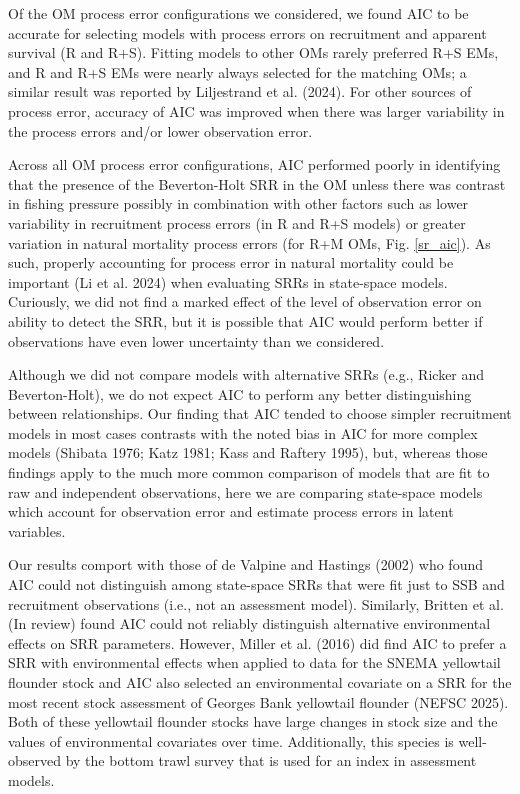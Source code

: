 \documentclass[
  12pt,
]{article}
\providecommand{\DIFaddbegin}{} %
\providecommand{\DIFaddend}{} %
\newcommand{\DIFaddincludegraphics}[2][]{{\color{blue}\fbox{\DIFOincludegraphics[#1]{#2}}}} %
\DeclareRobustCommand{\DIFaddbegin}{\DIFOaddbegin \let\includegraphics\DIFaddincludegraphics} %
\DeclareRobustCommand{\DIFaddend}{\DIFOaddend \let\includegraphics\DIFOincludegraphics} %
\begin{document}
Of the OM process error configurations we considered, we found AIC to be
accurate for selecting models with process errors on recruitment and
apparent survival (R and R+S). Fitting models to other OMs rarely
preferred R+S EMs, and R and R+S EMs were nearly always selected for the
matching OMs; a similar result was reported by Liljestrand et al.
(2024). For other sources of process error, accuracy of AIC was improved
when there was larger variability in the process errors and/or lower
observation error.

Across all OM process error configurations, AIC performed poorly in
identifying that the presence of the Beverton-Holt SRR in the OM unless
there was contrast in fishing pressure possibly in combination with
other factors such as lower variability in recruitment process errors
(in R and R+S models) or greater variation in natural mortality process
errors (for R+M OMs, Fig. \ref{sr_aic}). As such, properly accounting
for process error in natural mortality could be important (Li et al.
2024) when evaluating SRRs in state-space models. Curiously, we did not
find a marked effect of the level of observation error on ability to
detect the SRR, but it is possible that AIC would perform better if
observations have even lower uncertainty than we considered.

Although we did not compare models with alternative SRRs (e.g., Ricker
and Beverton-Holt), we do not expect AIC to perform any better
distinguishing between relationships. Our finding that AIC tended to
choose simpler recruitment models in most cases contrasts with the noted
bias in AIC for more complex models (Shibata 1976; Katz 1981; Kass and
Raftery 1995), but, whereas those findings apply to the much more common
comparison of models that are fit to raw and independent observations,
here we are comparing state-space models which account for observation
error and estimate process errors in latent variables.

Our results comport with those of \DIFaddbegin {\DIFaddend de Valpine and Hastings\DIFaddbegin } \DIFaddend (2002) who
found AIC could not distinguish among state-space SRRs that were fit
just to SSB and recruitment observations (i.e., not an assessment
model). Similarly, Britten et al. (In review) found AIC could not
reliably distinguish alternative environmental effects on SRR
parameters. However, Miller et al. (2016) did find AIC to prefer a SRR
with environmental effects when applied to data for the SNEMA yellowtail
flounder stock and AIC also selected an environmental covariate on a SRR
for the most recent stock assessment of Georges Bank yellowtail flounder
(NEFSC 2025). Both of these yellowtail flounder stocks have large
changes in stock size and the values of environmental covariates over
time. Additionally, this species is well-observed by the bottom trawl
survey that is used for an index in assessment models.
\end{document}
